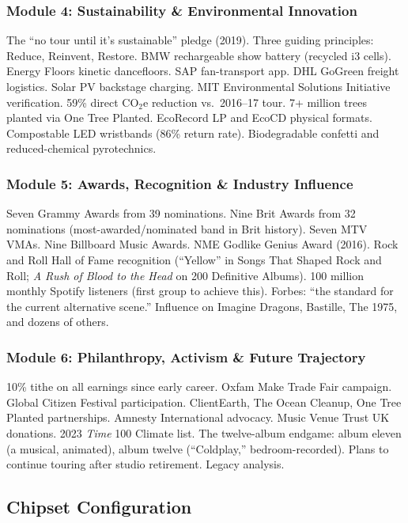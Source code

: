 \documentclass[11pt,letterpaper]{article}
\begin{document}
\subsubsection{Module 4: Sustainability \& Environmental Innovation}
The ``no tour until it's sustainable'' pledge (2019). Three guiding principles: Reduce, Reinvent, Restore. BMW rechargeable show battery (recycled i3 cells). Energy Floors kinetic dancefloors. SAP fan-transport app. DHL GoGreen freight logistics. Solar PV backstage charging. MIT Environmental Solutions Initiative verification. 59\% direct CO$_2$e reduction vs.\ 2016--17 tour. 7+ million trees planted via One Tree Planted. EcoRecord LP and EcoCD physical formats. Compostable LED wristbands (86\% return rate). Biodegradable confetti and reduced-chemical pyrotechnics.

\subsubsection{Module 5: Awards, Recognition \& Industry Influence}
Seven Grammy Awards from 39 nominations. Nine Brit Awards from 32 nominations (most-awarded/nominated band in Brit history). Seven MTV VMAs. Nine Billboard Music Awards. NME Godlike Genius Award (2016). Rock and Roll Hall of Fame recognition (``Yellow'' in Songs That Shaped Rock and Roll; \textit{A Rush of Blood to the Head} on 200 Definitive Albums). 100 million monthly Spotify listeners (first group to achieve this). Forbes: ``the standard for the current alternative scene.'' Influence on Imagine Dragons, Bastille, The 1975, and dozens of others.

\subsubsection{Module 6: Philanthropy, Activism \& Future Trajectory}
10\% tithe on all earnings since early career. Oxfam Make Trade Fair campaign. Global Citizen Festival participation. ClientEarth, The Ocean Cleanup, One Tree Planted partnerships. Amnesty International advocacy. Music Venue Trust UK donations. 2023 \textit{Time} 100 Climate list. The twelve-album endgame: album eleven (a musical, animated), album twelve (``Coldplay,'' bedroom-recorded). Plans to continue touring after studio retirement. Legacy analysis.

\subsection{Chipset Configuration}
\end{document}
